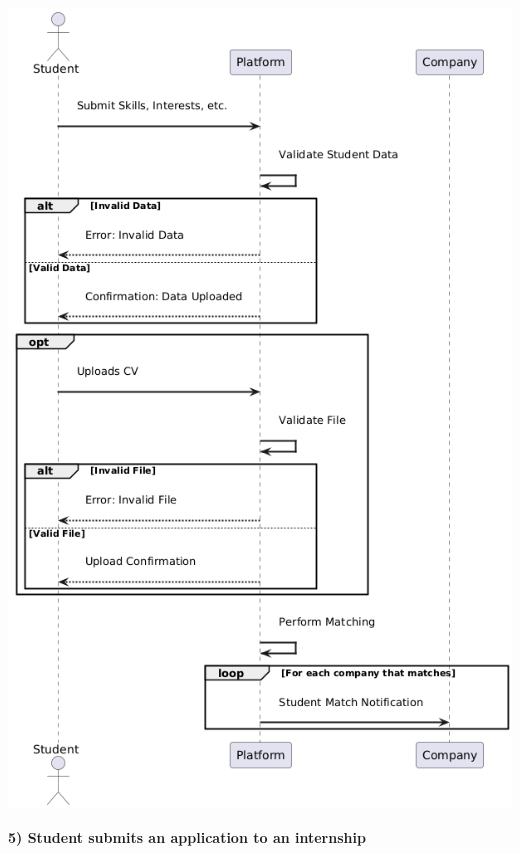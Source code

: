 \begin{center}
    \includegraphics[scale = 0.7]{Images/ImagesRASD/Personal_data_and_CV_upload.png}
\end{center}

\newpage
\textbf{5) Student submits an application to an internship}\\

